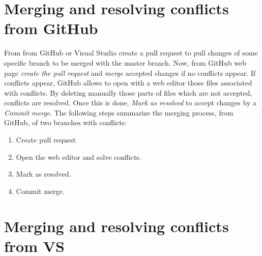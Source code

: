 \section{Merging and resolving conflicts from GitHub} 
 From  from GitHub or Visual Studio
create a pull request to pull changes of some specific branch to be merged with the master branch. 
Now, from GitHub web page \textit{create the pull request} and \textit{merge} accepted changes
if no conflicts appear. 
If conflicts appear, GitHub allows to open with a web editor those files associated with 
conflicts. By deleting manually those parts of files which are not accepted, 
conflicts are resolved. Once this is done, \textit{Mark as resolved} to accept changes
by a \textit{Commit merge}.
The following steps  summarize the merging process, from GitHub, of two branches with conflicts:
 \begin{enumerate} 
 \setlength\itemsep{0.0cm}
 \item Create pull request 
 \item Open the web editor and solve conflicts.  
 \item Mark as resolved. 
 \item Commit merge. 
  \end{enumerate}  
  
  

\section{Merging and resolving conflicts from VS}

